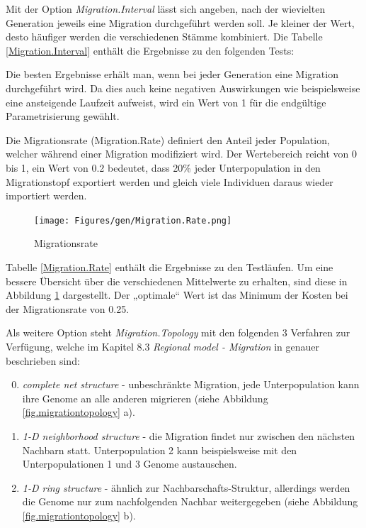 
Mit der Option \emph{Migration.Interval} lässt sich angeben, nach der wievielten
Generation jeweils eine Migration durchgeführt werden soll. Je kleiner der Wert,
desto häufiger werden die verschiedenen Stämme kombiniert. Die Tabelle
\ref{Migration.Interval} enthält die Ergebnisse zu den folgenden Tests:




\noindent Die besten Ergebnisse erhält man, wenn bei jeder Generation eine
Migration durchgeführt wird. Da dies auch keine negativen Auswirkungen wie
beispielsweise eine ansteigende Laufzeit aufweist, wird ein Wert von 1 für die
endgültige Parametrisierung gewählt.


Die Migrationsrate (Migration.Rate) definiert den Anteil jeder Population, welcher
während einer Migration modifiziert wird. Der Wertebereich reicht von 0 bis 1,
ein Wert von 0.2 bedeutet, dass 20\% jeder Unterpopulation in den Migrationstopf
exportiert werden und gleich viele Individuen daraus wieder importiert werden.


\begin{figure}[h!]
  \centering
  \texttt{[image: Figures/gen/Migration.Rate.png]}
  \caption{Migrationsrate}\label{fig.migrationrate}
\end{figure}

\noindent Tabelle \ref{Migration.Rate} enthält die Ergebnisse zu den Testläufen.
Um eine bessere Übersicht über die verschiedenen Mittelwerte zu erhalten, sind
diese in Abbildung \ref{fig.migrationrate} dargestellt. Der „optimale“ Wert
ist das Minimum der Kosten bei der Migrationsrate von 0.25.


Als weitere Option steht \emph{Migration.Topology} mit den folgenden 3 Verfahren
zur Verfügung, welche im Kapitel 8.3 \emph{Regional model - Migration} in
\citep{geatbx-ea} genauer beschrieben sind:
\begin{enumerate}
\setcounter{enumi}{-1} %
\item \emph{complete net structure} - unbeschränkte Migration, jede
      Unterpopulation kann ihre Genome an alle anderen migrieren (siehe Abbildung
      \ref{fig.migrationtopology} a).
\item \emph{1-D neighborhood structure} - die Migration findet nur zwischen den
      nächsten Nachbarn statt. Unterpopulation 2 kann beispielsweise mit den
      Unterpopulationen 1 und 3 Genome austauschen.
\item \emph{1-D ring structure} - ähnlich zur Nachbarschafts-Struktur, allerdings
      werden die Genome nur zum nachfolgenden Nachbar weitergegeben (siehe Abbildung
      \ref{fig.migrationtopology} b).
\end{enumerate}

